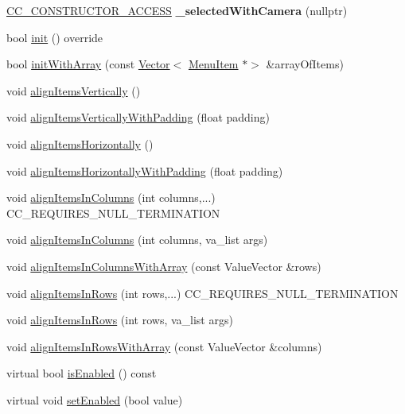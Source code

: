 \begin{DoxyCompactItemize}
\hyperlink{_2cocos2d_2cocos_2base_2ccConfig_8h_a25ef1314f97c35a2ed3d029b0ead6da0}{C\+C\+\_\+\+C\+O\+N\+S\+T\+R\+U\+C\+T\+O\+R\+\_\+\+A\+C\+C\+E\+SS} {\bfseries \+\_\+selected\+With\+Camera} (nullptr)
\item 
bool \hyperlink{classMenu_a64390e993f1abcf27799a2217a94dd38}{init} () override
\item 
bool \hyperlink{classMenu_add7f29cf9f8be81569134a7af40f9635}{init\+With\+Array} (const \hyperlink{classVector}{Vector}$<$ \hyperlink{classMenuItem}{Menu\+Item} $\ast$$>$ \&array\+Of\+Items)
\item 
void \hyperlink{classMenu_a9993bc6d1e63107a1ca661ba64a7ebd4}{align\+Items\+Vertically} ()
\item 
void \hyperlink{classMenu_a092a7f04579a919e723587d8cbe1c45d}{align\+Items\+Vertically\+With\+Padding} (float padding)
\item 
void \hyperlink{classMenu_a9b5aed1fdee862b7d1bc64193c90c2b0}{align\+Items\+Horizontally} ()
\item 
void \hyperlink{classMenu_afe60c06457d1f0805d17a4db9d2b150b}{align\+Items\+Horizontally\+With\+Padding} (float padding)
\item 
void \hyperlink{classMenu_a73728acb4dd4cad8bdd8e895014aa522}{align\+Items\+In\+Columns} (int columns,...) C\+C\+\_\+\+R\+E\+Q\+U\+I\+R\+E\+S\+\_\+\+N\+U\+L\+L\+\_\+\+T\+E\+R\+M\+I\+N\+A\+T\+I\+ON
\item 
void \hyperlink{classMenu_a2a568b7bfe853e3c73acba7e3622d220}{align\+Items\+In\+Columns} (int columns, va\+\_\+list args)
\item 
void \hyperlink{classMenu_a68484c458c9e99064204078a6ad2e2e8}{align\+Items\+In\+Columns\+With\+Array} (const Value\+Vector \&rows)
\item 
void \hyperlink{classMenu_aef711df55d67e0b3606049df72041dec}{align\+Items\+In\+Rows} (int rows,...) C\+C\+\_\+\+R\+E\+Q\+U\+I\+R\+E\+S\+\_\+\+N\+U\+L\+L\+\_\+\+T\+E\+R\+M\+I\+N\+A\+T\+I\+ON
\item 
void \hyperlink{classMenu_ac9e28ec85370f45fe4929cd393496a63}{align\+Items\+In\+Rows} (int rows, va\+\_\+list args)
\item 
void \hyperlink{classMenu_a858eac611f439f9f9432e6ebb1ec8cc0}{align\+Items\+In\+Rows\+With\+Array} (const Value\+Vector \&columns)
\item 
virtual bool \hyperlink{classMenu_a8d594f61997bb6ed9f62b083ed7a6001}{is\+Enabled} () const
\item 
virtual void \hyperlink{classMenu_a3f1338bc3391dd127892035935b48cdc}{set\+Enabled} (bool value)
$$
\end{DoxyCompactItemize}
